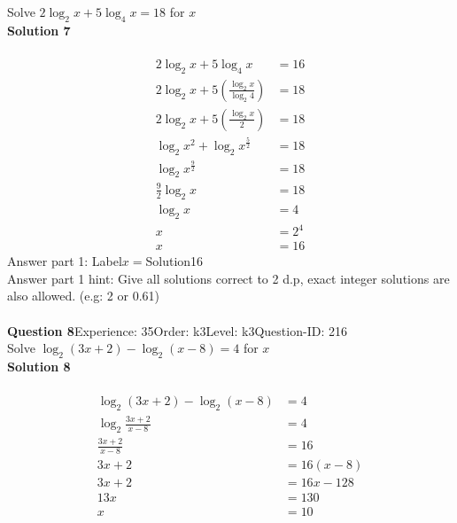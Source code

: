 \documentclass{article}
\begin{document}
Solve $2\log_{2}x+5\log_{4}x=18$ for $x$\\[4pt]
\noindent\textbf{Solution 7}\\[2pt]
\\[-35pt]\begin{align*}
2\log_{2}x+5\log_{4}x&=16\\[2pt]
2\log_{2}x+5\left(\displaystyle\frac{\log_{2}x}{\log_{2}4}\right)&=18\\[2pt]
2\log_{2}x+5\left(\displaystyle\frac{\log_{2}x}{2}\right)&=18\\[2pt]
\log_{2}x^2+\log_{2}x^{\frac{5}{2}}&=18\\[2pt]
\log_{2}x^{\frac{9}{2}}&=18\\[2pt]
\displaystyle\frac{9}{2}\log_{2}x&=18\\[2pt]
\log_{2}x&=4\\[2pt]
x&=2^{4}\\[2pt]
x&=16
\end{align*}
Answer part 1: \hspace{10pt}Label\hspace{10pt}$x=$\hspace{10pt}Solution\hspace{10pt}16\\
Answer part 1 hint: \hspace{15pt}Give all solutions correct to 2 d.p, exact integer solutions are also allowed. (e.g: 2 or 0.61)\\
\\[4pt]
\noindent\textbf{Question 8}\hspace{20pt}Experience: 35\hspace{20pt}Order: k3\hspace{20pt}Level: k3\hspace{20pt}Question-ID: 216\\[2pt]
Solve $\log_{2}(3x+2)-\log_{2}(x-8)=4$ for $x$\\[4pt]
\noindent\textbf{Solution 8}\\[2pt]
\\[-35pt]\begin{align*}
\log_{2}(3x+2)-\log_{2}(x-8)&=4\\[2pt]
\log_{2}\displaystyle\frac{3x+2}{x-8}&=4\\[2pt]
\displaystyle\frac{3x+2}{x-8}&=16\\[2pt]
3x+2&=16(x-8)\\[2pt]
3x+2&=16x-128\\[2pt]
13x&=130\\[2pt]
x&=10\\[-50pt]
\end{align*}
\end{document}
